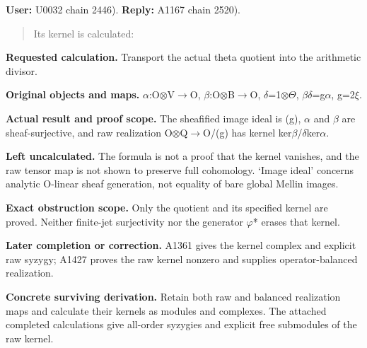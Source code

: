 \textbf{User:} U0032
\protect{} chain 2446).
\textbf{Reply:} A1167
\protect{} chain 2520).

\begin{quote}
Its kernel is calculated:
\end{quote}

\textbf{Requested calculation.} Transport the actual theta quotient into
the arithmetic divisor.

\textbf{Original objects and maps.}
\allowbreak{}\ensuremath{α}\allowbreak{}:O\allowbreak{}\ensuremath{⊗}\allowbreak{}V\allowbreak{}\ensuremath{→}\allowbreak{}O,
\allowbreak{}\ensuremath{β}\allowbreak{}:O\allowbreak{}\ensuremath{⊗}\allowbreak{}B\allowbreak{}\ensuremath{→}\allowbreak{}O,
\allowbreak{}\ensuremath{δ}\allowbreak{}=1\allowbreak{}\ensuremath{⊗}\allowbreak{}\allowbreak{}\ensuremath{Θ}\allowbreak{},
\allowbreak{}\ensuremath{β}\allowbreak{}\allowbreak{}\ensuremath{δ}\allowbreak{}=g\allowbreak{}\ensuremath{α}\allowbreak{},
g=2\allowbreak{}\ensuremath{ξ}\allowbreak{}.

\textbf{Actual result and proof scope.} The sheafified image ideal is
(g), \allowbreak{}\ensuremath{α}\allowbreak{} and
\allowbreak{}\ensuremath{β}\allowbreak{} are sheaf-surjective, and raw
realization
O\allowbreak{}\ensuremath{⊗}\allowbreak{}Q\allowbreak{}\ensuremath{→}\allowbreak{}O/(g)
has kernel
ker\allowbreak{}\ensuremath{β}\allowbreak{}/\allowbreak{}\ensuremath{δ}\allowbreak{}ker\allowbreak{}\ensuremath{α}\allowbreak{}.

\textbf{Left uncalculated.} The formula is not a proof that the kernel
vanishes, and the raw tensor map is not shown to preserve full
cohomology. `Image ideal' concerns analytic O-linear sheaf generation,
not equality of bare global Mellin images.

\textbf{Exact obstruction scope.} Only the quotient and its specified
kernel are proved. Neither finite-jet surjectivity nor the generator
\allowbreak{}\ensuremath{φ}\allowbreak{}* erases that kernel.

\textbf{Later completion or correction.} A1361 gives the kernel complex
and explicit raw syzygy; A1427 proves the raw kernel nonzero and
supplies operator-balanced realization.

\textbf{Concrete surviving derivation.} Retain both raw and balanced
realization maps and calculate their kernels as modules and complexes.
The attached completed calculations give all-order syzygies and explicit
free submodules of the raw kernel.

